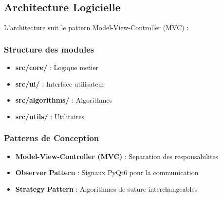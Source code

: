\documentclass[12pt,a4paper]{article}
\begin{document}
\subsection{Architecture Logicielle}

L'architecture suit le pattern Model-View-Controller (MVC) :

\subsubsection{Structure des modules}
\begin{itemize}
\item \textbf{src/core/} : Logique metier
\item \textbf{src/ui/} : Interface utilisateur
\item \textbf{src/algorithms/} : Algorithmes
\item \textbf{src/utils/} : Utilitaires
\end{itemize}

\subsubsection{Patterns de Conception}
\begin{itemize}
\item \textbf{Model-View-Controller (MVC)} : Separation des responsabilites
\item \textbf{Observer Pattern} : Signaux PyQt6 pour la communication
\item \textbf{Strategy Pattern} : Algorithmes de suture interchangeables
\end{itemize}
\end{document}
